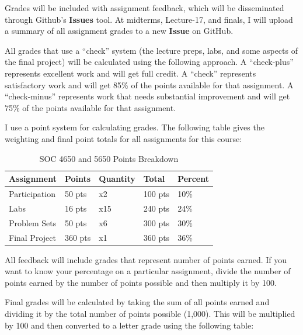 \documentclass[]{book}
\begin{document}
Grades will be included with assignment feedback, which will be disseminated through Github's \textbf{Issues} tool. At midterms, Lecture-17, and finals, I will upload a summary of all assignment grades to a new \textbf{Issue} on GitHub.

All grades that use a ``check'' system (the lecture preps, labs, and some aspects of the final project) will be calculated using the following approach. A ``check-plus'' represents excellent work and will get full credit. A ``check'' represents satisfactory work and will get 85\% of the points available for that assignment. A ``check-minus'' represents work that needs substantial improvement and will get 75\% of the points available for that assignment.

I use a point system for calculating grades. The following table gives the weighting and final point totals for all assignments for this course:

\begin{table}

\caption{\label{tab:unnamed-chunk-7}SOC 4650 and 5650 Points Breakdown}
\centering
\begin{tabular}[t]{lllll}
\toprule
Assignment & Points & Quantity & Total & Percent\\
\midrule
Participation & 50 pts & x2 & 100 pts & 10\%\\
Labs & 16 pts & x15 & 240 pts & 24\%\\
Problem Sets & 50 pts & x6 & 300 pts & 30\%\\
Final Project & 360 pts & x1 & 360 pts & 36\%\\
\bottomrule
\end{tabular}
\end{table}

All feedback will include grades that represent number of points earned. If you want to know your percentage on a particular assignment, divide the number of points earned by the number of points possible and then multiply it by 100.

Final grades will be calculated by taking the sum of all points earned and dividing it by the total number of points possible (1,000). This will be multiplied by 100 and then converted to a letter grade using the
following table:
\end{document}
